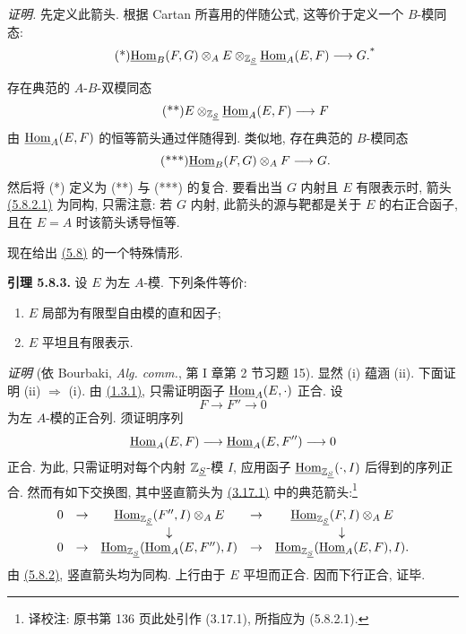 \emph{证明.} 先定义此箭头. 根据 Cartan 所喜用的伴随公式, 这等价于定义一个 \(B\)-模同态:
\begin{equation}\tag{*}
  \underline{\operatorname{Hom}}_B(F,G)\otimes_A E\otimes_{\mathbb Z_{\underline S}}\underline{\operatorname{Hom}}_A(E,F)
  \longrightarrow G.\text{\textsuperscript{*}}
\end{equation}
\begin{NoHyper}
\end{NoHyper}
存在典范的 \(A\)-\(B\)-双模同态
\begin{equation}\tag{**}
  E\otimes_{\mathbb Z_{\underline S}}\underline{\operatorname{Hom}}_A(E,F)
  \longrightarrow F
\end{equation}
由 \(\underline{\operatorname{Hom}}_A(E,F)\) 的恒等箭头通过伴随得到. 类似地, 存在典范的 \(B\)-模同态
\begin{equation}\tag{***}
  \underline{\operatorname{Hom}}_B(F,G)\otimes_A F\longrightarrow G.
\end{equation}
然后将 (*) 定义为 (**) 与 (***) 的复合. 要看出当 \(G\) 内射且 \(E\) 有限表示时, 箭头 \hyperlink{sga6.e01.eq.5-8-2-1}{(5.8.2.1)} 为同构, 只需注意: 若 \(G\) 内射, 此箭头的源与靶都是关于 \(E\) 的右正合函子, 且在 \(E=A\) 时该箭头诱导恒等.

现在给出 \hyperlink{sga6.e01.thm.5-8}{(5.8)} 的一个特殊情形.

\textbf{引理 5.8.3.} 设 \(E\) 为左 \(A\)-模. 下列条件等价:
\begin{enumerate}[label=(\roman*)]
\item \(E\) 局部为有限型自由模的直和因子;
\item \(E\) 平坦且有限表示.
\end{enumerate}

\emph{证明} (依 Bourbaki, \emph{Alg. comm.}, 第 I 章第 2 节习题 15). 显然 (i) 蕴涵 (ii). 下面证明 (ii) \(\Rightarrow\) (i). 由 \hyperlink{sga6.e01.lem.1-3-1}{(1.3.1)}, 只需证明函子 \(\underline{\operatorname{Hom}}_A(E,\cdot)\) 正合. 设
\[
  F\longrightarrow F''\longrightarrow 0
\]
为左 \(A\)-模的正合列. 须证明序列
\[
  \underline{\operatorname{Hom}}_A(E,F)\longrightarrow \underline{\operatorname{Hom}}_A(E,F'')\longrightarrow 0
\]
正合. 为此, 只需证明对每个内射 \(\mathbb Z_{\underline S}\)-模 \(I\), 应用函子 \(\underline{\operatorname{Hom}}_{\mathbb Z_{\underline S}}(\cdot,I)\) 后得到的序列正合. 然而有如下交换图, 其中竖直箭头为 \hyperlink{sga6.e01.eq.5-8-2-1}{(3.17.1)} 中的典范箭头:\footnote{译校注: 原书第 136 页此处引作 (3.17.1), 所指应为 (5.8.2.1).}
\[
\begin{array}{ccccccccc}
0&\to&\underline{\operatorname{Hom}}_{\mathbb Z_{\underline S}}(F'',I)\otimes_A E&\to&\underline{\operatorname{Hom}}_{\mathbb Z_{\underline S}}(F,I)\otimes_A E\\
&&\downarrow&&\downarrow\\
0&\to&\underline{\operatorname{Hom}}_{\mathbb Z_{\underline S}}(\underline{\operatorname{Hom}}_A(E,F''),I)&\to&\underline{\operatorname{Hom}}_{\mathbb Z_{\underline S}}(\underline{\operatorname{Hom}}_A(E,F),I).
\end{array}
\]
由 \hyperlink{sga6.e01.lem.5-8-2}{(5.8.2)}, 竖直箭头均为同构. 上行由于 \(E\) 平坦而正合. 因而下行正合, 证毕.

